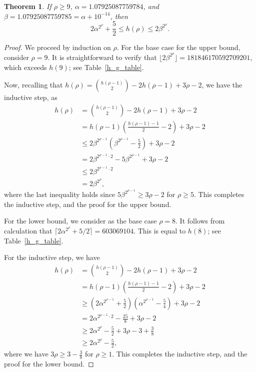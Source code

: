 \documentclass[10pt,a4paper]{amsart}
\newtheorem{theorem}{Theorem}
\newcommand{\round}{{\rho}}
\begin{document}
\begin{theorem}
If $\round \geq 9$, $\alpha = 1.07925087759784$, and 
$\beta = 1.07925087759785 = \alpha+10^{-14}$, then
    $$2 \alpha^{2^{\round}}+\frac{5}{2} \leq h(\round) \leq 2\beta^{2^{\round}}.$$
\label{Size of h(r)}
\end{theorem}

\begin{proof}
We proceed by induction on $\round$.  
For the base case for the upper bound, consider $\round=9$.  It is straightforward to verify that $\lfloor 2 \beta^{2^\round}\rfloor =181846170592709201$, which exceeds $h(9)$; see Table~\ref{h_g_table}. 

Now, recalling that $h(\round)=\binom{h(\round-1)}{2}-2h(\round-1)+3\round-2$, we have the inductive step, as 
\begin{align*}
h(\round) &= \binom{h(\round-1)}{2} -2h(\round-1)+3\round-2 \\
     &= h(\round-1)\left( \frac{h(\round-1)-1}{2} - 2 \right) +3\round-2 \\
     &\leq 2\beta^{2^{\round-1}} \left( \beta^{2^{\round-1}} - \frac{5}{2}\right)+3\round-2\\
     &= 2\beta^{2^{\round-1}\cdot 2} - 5 \beta^{2^{\round-1}} +3\round-2\\
     & \leq 2\beta^{2^{\round-1}\cdot 2}\\
     & = 2\beta^{2^{\round}},
\end{align*}
where the last inequality holds since $5 \beta^{2^{\round-1}} \geq 3\round-2$ for $\round \geq 5$. This completes the inductive step, and the proof for the upper bound. 

For the lower bound, we consider as the base case $\round=8$. It follows from calculation that $\lceil 2 \alpha^{2^\round}+5/2\rceil = 603069104$. 
This is equal to $h(8)$; see Table~\ref{h_g_table}. 


For the inductive step, we have 
\begin{align*}
h(\round) &=\binom{h(\round-1)}{2} -2h(\round-1)+3\round-2 \\
     &= h(\round-1)\left( \frac{h(\round-1)-1}{2} - 2 \right) +3\round-2 \\
     &\geq \left( 2 \alpha^{2^{\round-1}} +\frac{5}{2} \right)\left( \alpha^{2^{\round-1}}-\frac{5}{4}\right)+3\round-2\\
     &= 2 \alpha^{2^{\round-1}\cdot 2} - \frac{25}{8} +3\round-2\\
     & \geq 2 \alpha^{2^{\round}}- \frac{5}{2}+3\round-3+\frac{3}{8}\\
     & \geq 2 \alpha^{2^{\round}}-\frac{5}{2},
\end{align*}
where we have $3\round\geq 3-\frac{3}{8}$ for $\round \geq 1$. 
This completes the inductive step, and the proof for the lower bound.
\end{proof}
\end{document}
